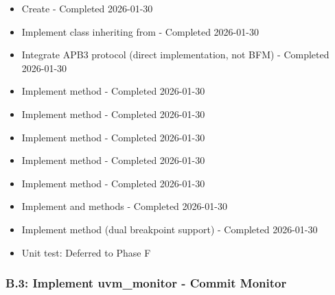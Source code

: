 \begin{record}

\begin{itemize}
\tightlist
\item[$\boxtimes$]
  Create  - Completed
  2026-01-30
\item[$\boxtimes$]
  Implement  class inheriting from
   - Completed 2026-01-30
\item[$\boxtimes$]
  Integrate APB3 protocol (direct implementation, not BFM) - Completed
  2026-01-30
\item[$\boxtimes$]
  Implement  method - Completed 2026-01-30
\item[$\boxtimes$]
  Implement  method - Completed 2026-01-30
\item[$\boxtimes$]
  Implement  method - Completed 2026-01-30
\item[$\boxtimes$]
  Implement  method - Completed 2026-01-30
\item[$\boxtimes$]
  Implement  method - Completed 2026-01-30
\item[$\boxtimes$]
  Implement  and  methods - Completed
  2026-01-30
\item[$\boxtimes$]
  Implement  method (dual breakpoint support) -
  Completed 2026-01-30
\item[$\boxtimes$]
  Unit test: Deferred to Phase F
\end{itemize}

\end{record}

\subsubsection{\texorpdfstring{B.3: Implement uvm\_\allowbreak{}monitor
- Commit Monitor}{B.3: Implement uvm\_monitor - Commit Monitor}}\label{cr:status:pyuvm-migration:b3-implement-uvm-monitor-commit-monitor}

